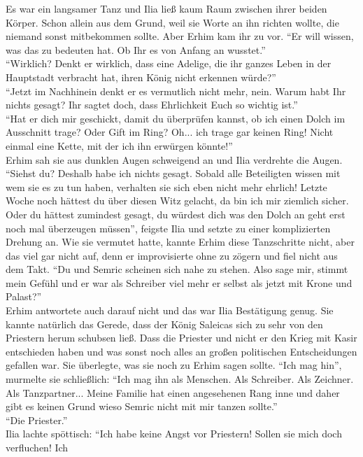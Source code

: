 Es war ein langsamer Tanz und Ilia ließ kaum Raum zwischen ihrer beiden Körper. Schon allein aus 
dem Grund, weil sie Worte an ihn richten wollte, die niemand sonst mitbekommen sollte. Aber Erhim 
kam ihr zu vor. ``Er will wissen, was das zu bedeuten hat. Ob Ihr es von Anfang an wusstet.''\\
``Wirklich? Denkt er wirklich, dass eine Adelige, die ihr ganzes Leben in der Hauptstadt verbracht 
hat, ihren König nicht erkennen würde?''\\
``Jetzt im Nachhinein denkt er es vermutlich nicht mehr, nein. Warum habt Ihr nichts gesagt? Ihr 
sagtet doch, dass Ehrlichkeit Euch so wichtig ist.''\\
``Hat er dich mir geschickt, damit du überprüfen kannst, ob ich einen Dolch im Ausschnitt trage? 
Oder Gift im Ring? Oh... ich trage gar keinen Ring! Nicht einmal eine Kette, mit der ich ihn 
erwürgen könnte!''\\
Erhim sah sie aus dunklen Augen schweigend an und Ilia verdrehte die Augen. ``Siehst du? Deshalb 
habe ich nichts gesagt. Sobald alle Beteiligten wissen mit wem sie es zu tun haben, verhalten sie 
sich eben nicht mehr ehrlich! Letzte Woche noch hättest du über diesen Witz gelacht, da bin ich mir 
ziemlich sicher. Oder du hättest zumindest gesagt, du würdest dich was den Dolch an geht erst noch 
mal überzeugen müssen'', feigste Ilia und setzte zu einer komplizierten Drehung an. Wie sie 
vermutet hatte, kannte Erhim diese Tanzschritte nicht, aber das viel gar nicht auf, denn er 
improvisierte ohne zu zögern und fiel nicht aus dem Takt. ``Du und Semric scheinen sich nahe zu 
stehen. Also sage mir, stimmt mein Gefühl und er war als Schreiber viel mehr er selbst als 
jetzt mit Krone und Palast?''\\
Erhim antwortete auch darauf nicht und das war Ilia Bestätigung genug. Sie kannte natürlich das 
Gerede, dass der König Saleicas sich zu sehr von den Priestern herum schubsen ließ. Dass die 
Priester und nicht er den Krieg mit Kasir entschieden haben und was sonst noch alles an großen 
politischen Entscheidungen gefallen war. Sie überlegte, was sie noch zu Erhim sagen sollte. ``Ich 
mag hin'', murmelte sie schließlich: ``Ich mag ihn als Menschen. Als Schreiber. Als Zeichner. Als 
Tanzpartner... Meine Familie hat einen angesehenen Rang inne und daher gibt es keinen 
Grund wieso Semric nicht mit mir tanzen sollte.''\\
``Die Priester.''\\
Ilia lachte spöttisch: ``Ich habe keine Angst vor Priestern! Sollen sie mich doch verfluchen! Ich 
